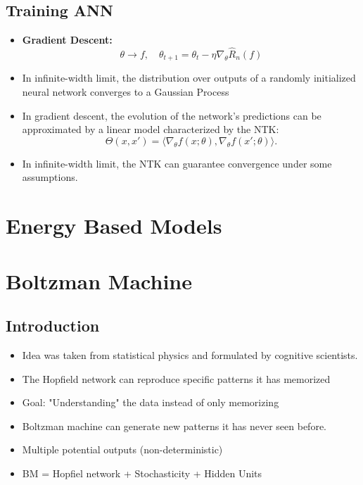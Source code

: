 \documentclass{antclass}
\begin{document}
\section{Training ANN}
\begin{itemize}
	
\item \textbf{Gradient Descent:}
\[
\theta\to f, \quad \theta_{t+1} = \theta_t - \eta \nabla_\theta \hat{R}_n(f)
\]


\item In infinite-width limit, the distribution over outputs of a randomly initialized neural network converges to a Gaussian Process%
\item In gradient descent, the evolution of the network’s predictions can be approximated by a linear model characterized by the NTK:
\[
\Theta(x,x') = \langle \nabla_\theta f(x;\theta), \nabla_\theta f(x';\theta) \rangle.
\]
\item In infinite-width limit, the NTK can guarantee convergence under some assumptions.
\end{itemize}
 





\chapter{Energy Based Models}

\chapter{Boltzman Machine}
\section{Introduction}
\begin{itemize}
 	\item Idea was taken from statistical physics and formulated by cognitive scientists.
	
	\item The Hopfield network can reproduce specific patterns it has memorized
 	
 	\item Goal: "Understanding" the data instead of only memorizing
 	
 	\item Boltzman machine can generate new patterns it has never seen before.
 	\item Multiple potential outputs (non-deterministic)
 	
 	\item BM = Hopfiel network + Stochasticity + Hidden Units

 
\end{itemize}
\end{document}
